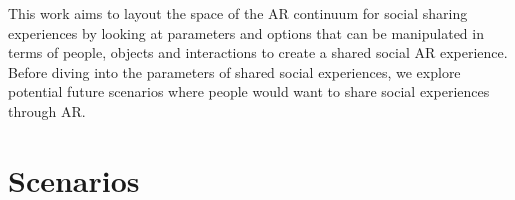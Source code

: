 

This work aims to layout the space of the AR continuum for social sharing experiences by looking at parameters and options that can be manipulated in terms of people, objects and interactions to create a shared social AR experience. Before diving into the parameters of shared social experiences, we explore potential future scenarios where people would want to share social experiences through AR.

\section{Scenarios}

